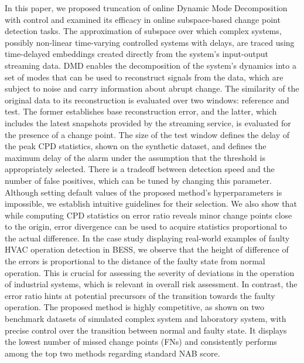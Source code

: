 In this paper, we proposed truncation of online Dynamic Mode Decomposition with control and examined its efficacy in online subspace-based change point detection tasks. The approximation of subspace over which complex systems, possibly non-linear time-varying controlled systems with delays, are traced using time-delayed embeddings created directly from the system's input-output streaming data. DMD enables the decomposition of the system's dynamics into a set of modes that can be used to reconstruct signals from the data, which are subject to noise and carry information about abrupt change. The similarity of the original data to its reconstruction is evaluated over two windows: reference and test. The former establishes base reconstruction error, and the latter, which includes the latest snapshots provided by the streaming service, is evaluated for the presence of a change point. The size of the test window defines the delay of the peak CPD statistics, shown on the synthetic dataset, and defines the maximum delay of the alarm under the assumption that the threshold is appropriately selected. There is a tradeoff between detection speed and the number of false positives, which can be tuned by changing this parameter. Although setting default values of the proposed method's hyperparameters is impossible, we establish intuitive guidelines for their selection. We also show that while computing CPD statistics on error ratio reveals minor change points close to the origin, error divergence can be used to acquire statistics proportional to the actual difference. In the case study displaying real-world examples of faulty HVAC operation detection in BESS, we observe that the height of difference of the errors is proportional to the distance of the faulty state from normal operation. This is crucial for assessing the severity of deviations in the operation of industrial systems, which is relevant in overall risk assessment. In contrast, the error ratio hints at potential precursors of the transition towards the faulty operation. The proposed method is highly competitive, as shown on two benchmark datasets of simulated complex system and laboratory system, with precise control over the transition between normal and faulty state. It displays the lowest number of missed change points (FNs) and consistently performs among the top two methods regarding standard NAB score.
